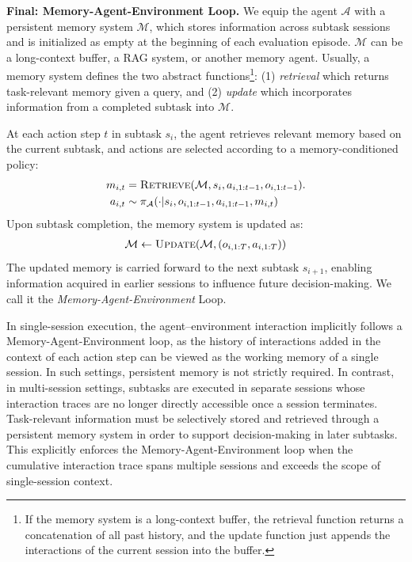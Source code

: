  \textbf{Final: Memory-Agent-Environment Loop.} 
We equip the agent $\mathcal{A}$ with a persistent memory system $\mathcal{M}$, which stores information across subtask sessions and is initialized as empty at the beginning of each evaluation episode. $\mathcal{M}$ can be a long-context buffer, a RAG system, or another memory agent. Usually, a memory system defines the two abstract functions\footnote{If the memory system is a long-context buffer, the retrieval function returns a concatenation of all past history, and the update function just appends the interactions of the current session into the buffer.}: (1) \textit{retrieval} which returns task-relevant memory given a query, and (2) \textit{update} which incorporates information from a completed subtask into $\mathcal{M}$. 

At each action step $t$ in subtask $s_i$, the agent retrieves relevant memory based on the current subtask, and actions are selected according to a memory-conditioned policy:
\begin{align}
    m_{i,t}&=\textsc{Retrieve}(\mathcal{M}, s_i, a_{i,1:t-1}, o_{i,1:t-1}). \\ a_{i,t} &\sim  \pi_{\mathcal{A}}(\cdot | s_i, o_{i, 1:t-1}, a_{i, 1:t-1}, m_{i,t})
\end{align}
Upon subtask completion, the memory system is updated as:
\begin{align}
    \mathcal{M} \leftarrow \textsc{Update}(\mathcal{M}, (o_{i,1:T}, a_{i,1:T}))
\end{align}
The updated memory is carried forward to the next subtask $s_{i+1}$, enabling information acquired in earlier sessions to influence future decision-making. We call it the \textit{Memory-Agent-Environment} Loop. 

In single-session execution, the agent–environment interaction implicitly follows a Memory-Agent-Environment loop, as the history of interactions added in the context of each action step can be viewed as the working memory of a single session. In such settings, persistent memory is not strictly required. In contrast, in multi-session settings,  subtasks are executed in separate sessions whose interaction traces are no longer directly accessible once a session terminates.  Task-relevant information must be selectively stored and retrieved through a persistent memory system in order to support decision-making in later subtasks. This explicitly enforces the Memory-Agent-Environment loop when the cumulative interaction trace spans multiple sessions and exceeds the scope of single-session context. 


